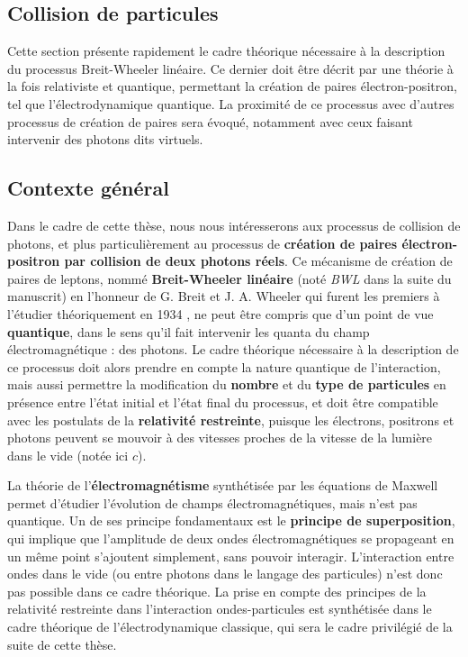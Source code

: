 \begin{refsection}
\section{Collision de particules}
Cette section présente rapidement le cadre théorique nécessaire à la description du processus Breit-Wheeler linéaire. Ce dernier doit être décrit par une théorie à la fois relativiste et quantique, permettant la création de paires électron-positron, tel que l'électrodynamique quantique. La proximité de ce processus avec d'autres processus de création de paires sera évoqué, notamment avec ceux faisant intervenir des photons dits virtuels. 

\subsection{Contexte général}

Dans le cadre de cette thèse, nous nous intéresserons aux processus de collision de photons, et plus particulièrement au processus de \textbf{création de paires électron-positron par collision de deux photons réels}. Ce mécanisme de création de paires de leptons, nommé \textbf{Breit-Wheeler linéaire} (noté \textit{BWL} dans la suite du manuscrit) en l'honneur de G. Breit et J. A. Wheeler qui furent les premiers à l'étudier théoriquement en 1934 \parencite{breit_1934}, ne peut être compris que d'un point de vue \textbf{quantique}, dans le sens qu'il fait intervenir les quanta du champ électromagnétique : des photons. Le cadre théorique nécessaire à la description de ce processus doit alors prendre en compte la nature quantique de l'interaction, mais aussi permettre la modification du \textbf{nombre} et du \textbf{type de particules} en présence entre l'état initial et l'état final du processus, et doit être compatible avec les postulats de la \textbf{relativité restreinte}, puisque les électrons, positrons et photons peuvent se mouvoir à des vitesses proches de la vitesse de la lumière dans le vide (notée ici $c$).

La théorie de l'\textbf{électromagnétisme} synthétisée par les équations de Maxwell permet d'étudier l'évolution de champs électromagnétiques, mais n'est pas quantique. Un de ses principe fondamentaux est le \textbf{principe de superposition}, qui implique que l'amplitude de deux ondes électromagnétiques se propageant en un même point s'ajoutent simplement, sans pouvoir interagir. L'interaction entre ondes dans le vide (ou entre photons dans le langage des particules) n'est donc pas possible dans ce cadre théorique. La prise en compte des principes de la relativité restreinte dans l'interaction ondes-particules est synthétisée dans le cadre théorique de l'électrodynamique classique, qui sera le cadre privilégié de la suite de cette thèse. 


\end{refsection}
